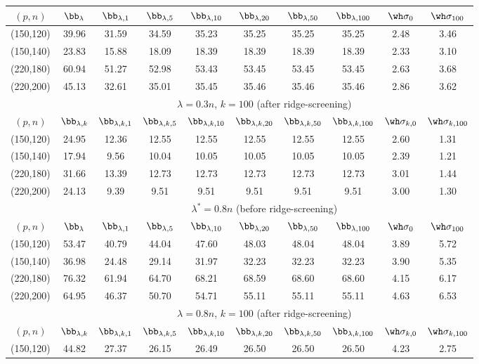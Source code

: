 {{\begin{table}[htp]
{\begin{center}
\begin{tabular}{cccccccccc}
\cline{2-10}
$(p,n)$&$\bb_{\lambda}$&$\bb_{\lambda,1}$&$\bb_{\lambda,5}$&$\bb_{\lambda,10}$&$\bb_{\lambda,20}$&$\bb_{\lambda,50}$&$\bb_{\lambda,100}$&$\wh\sigma_0$&$\wh\sigma_{100}$\\
\hline
(150,120)&39.96&31.59&34.59&35.23&35.25&35.25&35.25&2.48&3.46\\
(150,140)&23.83&15.88&18.09&18.39&18.39&18.39&18.39&2.33&3.10\\
(220,180)&60.94&51.27&52.98&53.43&53.45&53.45&53.45&2.63&3.68\\
(220,200)&45.13&32.61&35.01&35.45&35.46&35.46&35.46&2.86&3.62\\
\midrule
&\multicolumn{9}{c}{$\lambda=0.3n$, $k=100$ (after ridge-screening)}\\
\cline{2-10}
$(p,n)$&$\bb_{\lambda,k}$&$\bb_{\lambda,k,1}$&$\bb_{\lambda,k,5}$&$\bb_{\lambda,k,10}$&$\bb_{\lambda,k,20}$&$\bb_{\lambda,k,50}$&$\bb_{\lambda,k,100}$&$\wh\sigma_{k,0}$&$\wh\sigma_{k,100}$\\
\hline
(150,120)&24.95&12.36&12.55&12.55&12.55&12.55&12.55&2.60&1.31\\
(150,140)&17.94&9.56&10.04&10.05&10.05&10.05&10.05&2.39&1.21\\
(220,180)&31.66&13.39&12.73&12.73&12.73&12.73&12.73&3.01&1.44\\
(220,200)&24.13&9.39&9.51&9.51&9.51&9.51&9.51&3.00&1.30\\
\midrule
\midrule
&\multicolumn{9}{c}{$\lambda^*=0.8n$ (before ridge-screening)}\\
\cline{2-10}
$(p,n)$&$\bb_{\lambda}$&$\bb_{\lambda,1}$&$\bb_{\lambda,5}$&$\bb_{\lambda,10}$&$\bb_{\lambda,20}$&$\bb_{\lambda,50}$&$\bb_{\lambda,100}$&$\wh\sigma_0$&$\wh\sigma_{100}$\\
\hline
(150,120)&53.47&40.79&44.04&47.60&48.03&48.04&48.04&3.89&5.72\\
(150,140)&36.98&24.48&29.14&31.97&32.23&32.23&32.23&3.90&5.35\\
(220,180)&76.32&61.94&64.70&68.21&68.59&68.60&68.60&4.15&6.17\\
(220,200)&64.95&46.37&50.70&54.71&55.11&55.11&55.11&4.63&6.53\\
\midrule
&\multicolumn{9}{c}{$\lambda=0.8n$, $k=100$ (after ridge-screening)}\\
\cline{2-10}
$(p,n)$&$\bb_{\lambda,k}$&$\bb_{\lambda,k,1}$&$\bb_{\lambda,k,5}$&$\bb_{\lambda,k,10}$&$\bb_{\lambda,k,20}$&$\bb_{\lambda,k,50}$&$\bb_{\lambda,k,100}$&$\wh\sigma_{k,0}$&$\wh\sigma_{k,100}$\\
\hline
(150,120)&44.82&27.37&26.15&26.49&26.50&26.50&26.50&4.23&2.75\\

\end{tabular}
\end{center}}
\end{table}}}
